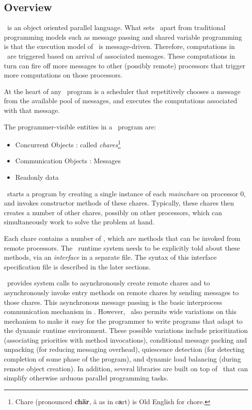 \subsection{Overview}

\charmpp\ is an object oriented parallel language. What sets \charmpp\ apart
from traditional programming models such as message passing and shared variable
programming is that the execution model of \charmpp\ is message-driven.
Therefore, computations in \charmpp\ are triggered based on arrival of
associated messages. These computations in turn can fire off more messages to
other (possibly remote) processors that trigger more computations on those
processors.

At the heart of any \charmpp\ program is a scheduler that repetitively chooses
a message from the available pool of messages, and executes the computations
associated with that message.

The programmer-visible entities in a \charmpp\ program are:

\begin{itemize}
\item Concurrent Objects : called {\em chares}\footnote{
      Chare (pronounced {\bf ch\"ar}, \"a as in c{\bf a}rt) is Old 
      English for chore.
      }
\item Communication Objects : Messages
\item Readonly data
\end{itemize}

\charmpp\ starts a program by creating a single  instance of each
{\em mainchare} on processor 0, and invokes constructor methods of these
chares.  Typically, these chares then creates a number of other 
chares, possibly on other processors, which can simultaneously work to solve
the problem at hand.

Each chare contains a number of , which are methods that can be invoked from remote processors. The
\charmpp\ runtime system needs to be explicitly told about these methods, via
an {\em interface} in a separate file.  The syntax of this interface
specification file is described in the later sections.

\charmpp\ provides system calls to asynchronously create remote 
chares and to asynchronously invoke entry methods on remote chares by sending
 messages to those chares. This asynchronous
message passing is the basic interprocess communication
mechanism in \charmpp. However, \charmpp\ also permits wide variations on this
mechanism to make it easy for the programmer to write programs that adapt to
the dynamic runtime environment.  These possible variations include
prioritization (associating priorities with method invocations), conditional
message packing and unpacking (for reducing messaging
overhead), quiescence detection (for detecting completion of
some phase of the program), and dynamic load balancing (during remote object
creation). In addition, several libraries are built on top of \charmpp\ that
can simplify otherwise arduous parallel programming tasks.

